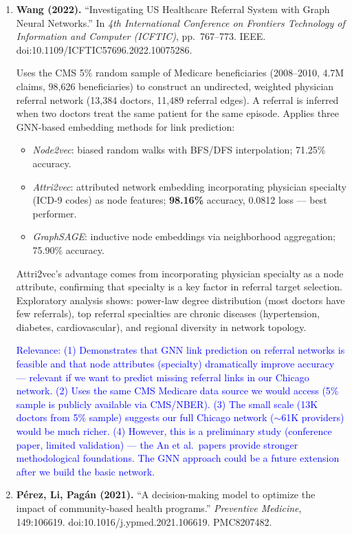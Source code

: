\documentclass[11pt]{article}
\begin{document}
\begin{enumerate}
\item \textbf{Wang (2022).} ``Investigating US Healthcare Referral System with Graph Neural Networks.'' In \textit{4th International Conference on Frontiers Technology of Information and Computer (ICFTIC)}, pp.~767--773. IEEE. doi:10.1109/ICFTIC57696.2022.10075286.

Uses the CMS 5\% random sample of Medicare beneficiaries (2008--2010, 4.7M claims, 98,626 beneficiaries) to construct an undirected, weighted physician referral network (13,384 doctors, 11,489 referral edges). A referral is inferred when two doctors treat the same patient for the same episode. Applies three GNN-based embedding methods for link prediction:
\begin{itemize}
    \item \textit{Node2vec}: biased random walks with BFS/DFS interpolation; 71.25\% accuracy.
    \item \textit{Attri2vec}: attributed network embedding incorporating physician specialty (ICD-9 codes) as node features; \textbf{98.16\%} accuracy, 0.0812 loss --- best performer.
    \item \textit{GraphSAGE}: inductive node embeddings via neighborhood aggregation; 75.90\% accuracy.
\end{itemize}
Attri2vec's advantage comes from incorporating physician specialty as a node attribute, confirming that specialty is a key factor in referral target selection. Exploratory analysis shows: power-law degree distribution (most doctors have few referrals), top referral specialties are chronic diseases (hypertension, diabetes, cardiovascular), and regional diversity in network topology.

\textcolor{blue}{Relevance: (1) Demonstrates that GNN link prediction on referral networks is feasible and that node attributes (specialty) dramatically improve accuracy --- relevant if we want to predict missing referral links in our Chicago network. (2) Uses the same CMS Medicare data source we would access (5\% sample is publicly available via CMS/NBER). (3) The small scale (13K doctors from 5\% sample) suggests our full Chicago network ($\sim$61K providers) would be much richer. (4) However, this is a preliminary study (conference paper, limited validation) --- the An et al.\ papers provide stronger methodological foundations. The GNN approach could be a future extension after we build the basic network.}

\item \textbf{P\'{e}rez, Li, Pag\'{a}n (2021).} ``A decision-making model to optimize the impact of community-based health programs.'' \textit{Preventive Medicine}, 149:106619. doi:10.1016/j.ypmed.2021.106619. PMC8207482.


\end{enumerate}
\end{document}
